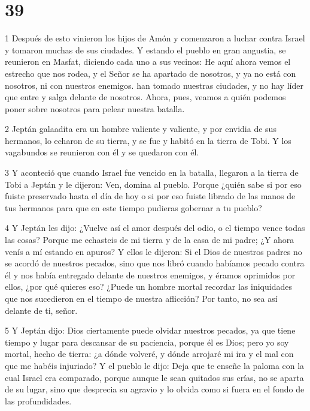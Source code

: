 \chapter{39}

\par 1 Después de esto vinieron los hijos de Amón y comenzaron a luchar contra Israel y tomaron muchas de sus ciudades. Y estando el pueblo en gran angustia, se reunieron en Masfat, diciendo cada uno a sus vecinos: He aquí ahora vemos el estrecho que nos rodea, y el Señor se ha apartado de nosotros, y ya no está con nosotros, ni con nuestros enemigos. han tomado nuestras ciudades, y no hay líder que entre y salga delante de nosotros. Ahora, pues, veamos a quién podemos poner sobre nosotros para pelear nuestra batalla.

\par 2 Jeptán galaadita era un hombre valiente y valiente, y por envidia de sus hermanos, lo echaron de su tierra, y se fue y habitó en la tierra de Tobi. Y los vagabundos se reunieron con él y se quedaron con él.

\par 3 Y aconteció que cuando Israel fue vencido en la batalla, llegaron a la tierra de Tobi a Jeptán y le dijeron: Ven, domina al pueblo. Porque ¿quién sabe si por eso fuiste preservado hasta el día de hoy o si por eso fuiste librado de las manos de tus hermanos para que en este tiempo pudieras gobernar a tu pueblo?

\par 4 Y Jeptán les dijo: ¿Vuelve así el amor después del odio, o el tiempo vence todas las cosas? Porque me echasteis de mi tierra y de la casa de mi padre; ¿Y ahora venís a mí estando en apuros? Y ellos le dijeron: Si el Dios de nuestros padres no se acordó de nuestros pecados, sino que nos libró cuando habíamos pecado contra él y nos había entregado delante de nuestros enemigos, y éramos oprimidos por ellos, ¿por qué quieres eso? ¿Puede un hombre mortal recordar las iniquidades que nos sucedieron en el tiempo de nuestra aflicción? Por tanto, no sea así delante de ti, señor.

\par 5 Y Jeptán dijo: Dios ciertamente puede olvidar nuestros pecados, ya que tiene tiempo y lugar para descansar de su paciencia, porque él es Dios; pero yo soy mortal, hecho de tierra: ¿a dónde volveré, y dónde arrojaré mi ira y el mal con que me habéis injuriado? Y el pueblo le dijo: Deja que te enseñe la paloma con la cual Israel era comparado, porque aunque le sean quitados sus crías, no se aparta de su lugar, sino que desprecia su agravio y lo olvida como si fuera en el fondo de las profundidades.

